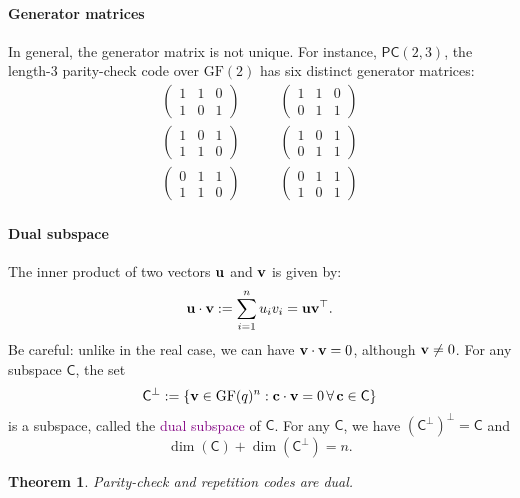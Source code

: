 \documentclass[a4paper, 11pt, openany]{book}
\numberwithin{equation}{section}
\theoremstyle{plain}
\newtheorem{theorem}	[equation]	{Theorem}
\theoremstyle{definition}
\newcommand{\GF}{\mathrm{GF}}
\newcommand{\Define}[1]{\textcolor{purple}{#1}}
\newcommand{\code}[1]{\mathsf{#1}}
\newcommand{\Paritycheck}           {\code{PC}}
\begin{document}
\paragraph{Generator matrices}
In general, the generator matrix is not unique. For instance, $\Paritycheck(2,3)$, the length-3 parity-check code over $\GF(2)$ has six distinct generator matrices:
\begin{align*}
	\begin{pmatrix}
	1 & 1 & 0\\
	1 & 0 & 1
	\end{pmatrix} \quad & \quad
	\begin{pmatrix}
	1 & 1 & 0\\
	0 & 1 & 1
	\end{pmatrix}\\
	\begin{pmatrix}
	1 & 0 & 1\\
	1 & 1 & 0
	\end{pmatrix} \quad & \quad
	\begin{pmatrix}
	1 & 0 & 1\\
	0 & 1 & 1
	\end{pmatrix}\\
	\begin{pmatrix}
	0 & 1 & 1\\
	1 & 1 & 0
	\end{pmatrix} \quad & \quad
	\begin{pmatrix}
	0 & 1 & 1\\
	1 & 0 & 1
	\end{pmatrix}
\end{align*}



\paragraph{Dual subspace}
The inner product of two vectors ${\bf u}$ and ${\bf v}$ is given by:
\[
	{\bf u} \cdot {\bf v} := \sum_{i=1}^n u_i v_i = {\bf u} {\bf v}^\top.
\]
Be careful: unlike in the real case, we can have ${\bf v} \cdot {\bf v} = 0$, although ${\bf v} \ne 0$. For any subspace $\code{C}$, the set 
\[
	\code{C}^\perp := \{{\bf v} \in \GF(q)^n: {\bf c} \cdot {\bf v} = 0 \,\forall\, {\bf c} \in \code{C}\}
\]
is a subspace, called the \Define{dual subspace} of $\code{C}$. For any $\code{C}$, we have $(\code{C}^\perp)^\perp = \code{C}$ and
\[
    \dim(\code{C}) + \dim(\code{C}^\perp) = n.
\]

\begin{theorem}
Parity-check and repetition codes are dual.
\end{theorem}
\end{document}
